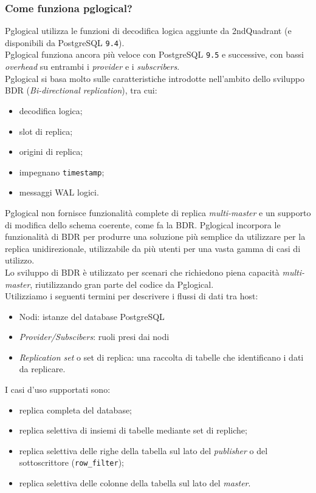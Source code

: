 \subsubsection{Come funziona pglogical?}
Pglogical utilizza le funzioni di decodifica logica aggiunte da 2ndQuadrant (e disponibili da PostgreSQL \verb"9.4"). \\
Pglogical funziona ancora pi\`{u} veloce con PostgreSQL \verb"9.5" e successive, con bassi \textit{overhead} su entrambi i \textit{provider} e i \textit{subscribers}.\\
Pglogical si basa molto sulle caratteristiche introdotte nell'ambito dello sviluppo BDR (\textit{Bi-directional replication}), tra cui:

\begin{itemize}
\item
decodifica logica;
\item
slot di replica;
\item
origini di replica;
\item
impegnano \verb"timestamp";
\item
messaggi WAL logici.\cite{etichetta3}
\end{itemize}

Pglogical non fornisce funzionalit\`{a} complete di replica \textit{multi-master} e un supporto di modifica dello schema coerente, come fa la BDR. Pglogical incorpora le funzionalit\`{a} di BDR per produrre una soluzione pi\`{u} semplice da utilizzare per la replica unidirezionale, utilizzabile da pi\`{u} utenti per una vasta gamma di casi di utilizzo. \\
Lo sviluppo di BDR \`{e} utilizzato per scenari che richiedono piena capacit\`{a} \textit{multi-master}, riutilizzando gran parte del codice da Pglogical.\cite{etichetta3}\\

Utilizziamo i seguenti termini per descrivere i flussi di dati tra host:

\begin{itemize}
\item
Nodi: istanze del database PostgreSQL
\item 
\textit{Provider/Subscibers}: ruoli presi dai nodi
\item 
\textit{Replication set} o set di replica: una raccolta di tabelle che identificano i dati da replicare.
\end{itemize}

I casi d'uso supportati sono:
\begin{itemize}
\item 
replica completa del database;
\item 
replica selettiva di insiemi di tabelle mediante set di repliche;
\item 
replica selettiva delle righe della tabella sul lato del \textit{publisher} o del sottoscrittore (\verb"row_filter");
\item 
replica selettiva delle colonne della tabella sul lato del \textit{master}.\cite{etichetta3}
\end{itemize}

